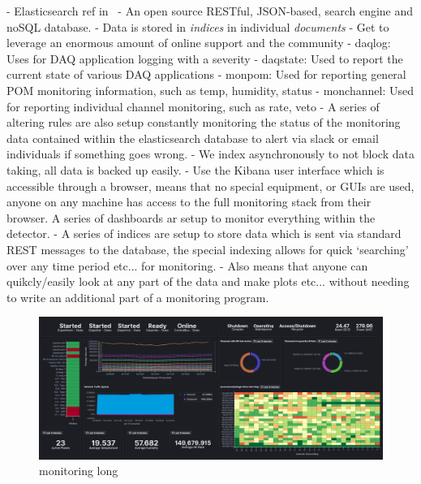 - Elasticsearch ref in~\cite{elastic2020}
- An open source RESTful, JSON-based, search engine and noSQL database.
- Data is stored in \emph{indices} in individual \emph{documents}
- Get to leverage an enormous amount of online support and the community
- daqlog: Uses for DAQ application logging with a severity
- daqstate: Used to report the current state of various DAQ applications
- monpom: Used for reporting general POM monitoring information, such as temp, humidity, status
- monchannel: Used for reporting individual channel monitoring, such as rate, veto
- A series of altering rules are also setup constantly monitoring the status of the monitoring
data contained within the elasticsearch database to alert via slack or email individuals if something goes wrong.
- We index asynchronously to not block data taking, all data is backed up easily.
- Use the Kibana user interface which is accessible through a browser, means that no special
equipment, or GUIs are used, anyone on any machine has access to the full monitoring stack from
their browser. A series of dashboards ar setup to monitor everything within the detector.
- A series of indices are setup to store data which is sent via standard REST messages to the
database, the special indexing allows for quick `searching' over any time period etc... for
monitoring.
- Also means that anyone can quikcly/easily look at any part of the data and make plots etc...
without needing to write an additional part of a monitoring program.

\begin{figure} %
    \includegraphics[width=\textwidth]{diagrams/5-daq/monitoring.png}
    \caption[monitoring short]
    {monitoring long}
    \label{fig:monitoring}
\end{figure}